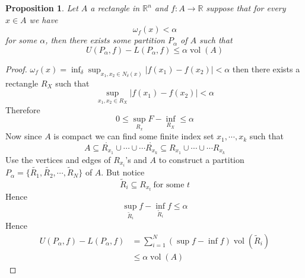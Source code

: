 \documentclass[11pt,openany]{book}
\theoremstyle{plain}
\newtheorem{proposition}{Proposition}[chapter]
\theoremstyle{definition}
\theoremstyle{remark}
\newcommand{\R}{\mathbb{R}}
\newcommand{\set}[1]{\{ #1 \}}
\newcommand{\vol}{\operatorname{vol}}
\begin{document}
\begin{proposition}
    Let $A$ a rectangle in $\R^n$ and $f \colon A \to \R$ suppose that for every $x \in A$ we have 
    $$\omega_f(x) < \alpha$$
    for some $\alpha$, then there exists some partition $P_\alpha$ of $A$ such that
    $$U(P_\alpha, f) - L(P_\alpha,f) \le \alpha \vol (A)$$
\end{proposition}

\begin{proof}
    $\omega_f (x) = \inf_\delta \sup_{x_1, x_2 \in N_\delta(x)} |{f(x_1) - f(x_2)}| < \alpha$ 
    then there exists a rectangle $R_X$ such that 
    $$\sup_{x_1, x_2 \in R_X} |{f(x_1) - f(x_2)}| < \alpha$$
    Therefore 
    $$0 \le \sup_{R_x} F - \inf_{R_X} \le \alpha$$
    Now since $A$ is compact we can find some finite index set $x_1, \cdots, x_k$ such that 
    $$A \subseteq \mathring{R_{x_1}} \cup \cdots \cup \cdots \mathring{R_{x_k}} \subseteq R_{x_1} \cup \cdots \cup \cdots R_{x_k}$$
    Use the vertices and edges of $R_{x_i}$'s and $A$ to construct a partition 
    $P_\alpha = \set{\tilde{R_1}, \tilde{R_2}, \cdots, \tilde{R}_N}$ of $A$. But notice 
    $$\tilde{R}_i \subseteq R_{x_t} \ \text{for some $t$}$$
    Hence 
    $$\sup_{\tilde{R}_i} f - \inf_{\tilde{R}_i} f \le \alpha$$
    Hence 
    \begin{align*}
        U(P_\alpha, f) - L(P_\alpha, f) &= \sum_{i=1}^N (\sup f - \inf f) \vol (\tilde{R}_i) \\
        &\le \alpha \vol (A)
    \end{align*} 
\end{proof}
\end{document}
